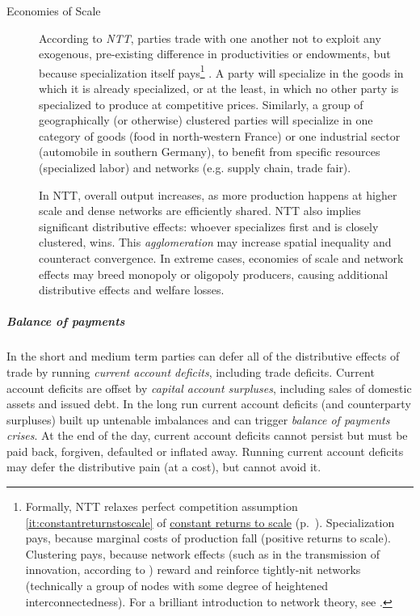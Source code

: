 \begin{description}
	\item[Economies of Scale] \label{it:NTT} According to \emph{\gls{NTT}}, parties trade with one another not to exploit any exogenous, pre-existing difference in productivities or endowments, but because specialization itself pays\footnote{
		Formally, \gls{NTT} relaxes perfect competition assumption \ref{it:constantreturnstoscale} of \hyperref[it:constantreturnstoscale]{constant returns to scale} (p.~\pageref{it:constantreturnstoscale}). Specialization pays, because marginal costs of production fall (positive returns to scale). Clustering pays, because network effects (such as in the transmission of innovation, according to \citealt{Bass1969}) reward and reinforce tightly-nit networks (technically a group of nodes with some degree of heightened interconnectedness). For a brilliant introduction to network theory, see \cite{Kleinberg-2009-oz}.} 
	\citep{Krugman-1980-aa}. A party will specialize in the goods in which it is already specialized, or at the least, in which no other party is specialized to produce at competitive prices. Similarly, a group of geographically (or otherwise) clustered parties will specialize in one category of goods (food in north-western France) or one industrial sector (automobile in southern Germany), to benefit from specific resources (specialized labor) and networks (e.g. supply chain, trade fair).

	In \gls{NTT}, overall output increases, as more production happens at higher scale and dense networks are efficiently shared. \gls{NTT} also implies significant distributive effects: whoever specializes first and is closely clustered, wins. This \emph{agglomeration} may increase spatial inequality and counteract convergence. %
	In extreme cases, economies of scale and network effects may breed monopoly or oligopoly producers, causing additional distributive effects and welfare losses.
\end{description}

\subparagraph{Balance of payments}
In the short and medium term parties can defer all of the distributive effects of trade by running \emph{current account deficits}, including trade deficits. Current account deficits are offset by \emph{capital account surpluses}, including sales of domestic assets and issued debt. In the long run current account deficits (and counterparty surpluses) built up untenable imbalances and can trigger \emph{balance of payments crises}. At the end of the day, current account deficits cannot persist but must be paid back, forgiven, defaulted or inflated away. Running current account deficits may defer the distributive pain (at a cost), but cannot avoid it.

